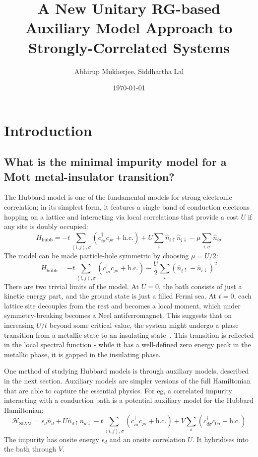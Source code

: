 \documentclass{report}
\title{A New Unitary RG-based Auxiliary Model Approach to Strongly-Correlated Systems}
\author{Abhirup Mukherjee, Siddhartha Lal}
\affil{Indian Institute of Science Education and Research Kolkata, Mohanpur}
\date{\today}
\numberwithin{equation}{section}
\begin{document}
\maketitle
\tableofcontents
\newpage
\chapter{Introduction}

\section{What is the minimal impurity model for a Mott metal-insulator transition?}
\label{sec:min_model}
The Hubbard model is one of the fundamental models for strong electronic correlation; in its simplest form, it features a single band of conduction electrons hopping on a lattice and interacting via local correlations that provide a cost \(U\) if any site is doubly occupied:
\[H_\text{hubb} = -t\sum_{\left<i,j \right>,\sigma}\left(c^\dagger_{i\sigma}c_{j\sigma}+\text{h.c.}\right) + U\sum_i \hat n_{i \uparrow} \hat n_{i \downarrow} - \mu \sum_{i,\sigma}\hat n_{i\sigma}\]
The model can be made particle-hole symmetric by choosing \(\mu = U/2\):
\[H_\text{hubb} = -t\sum_{\left<i,j \right>,\sigma}\left(c^\dagger_{i\sigma}c_{j\sigma}+\text{h.c.}\right) - \frac{U}{2}\sum_i \left(\hat n_{i \uparrow} - \hat n_{i \downarrow}\right)^2\]
There are two trivial limits of the model. At \(U=0\), the bath consists of just a kinetic energy part, and the ground state is just a filled Fermi sea. At \(t=0\), each lattice site decouples from the rest and becomes a local moment, which under symmetry-breaking becomes a Neel antiferromagnet. This suggests that on increasing \(U/t\) beyond some critical value, the system might undergo a phase transition from a metallic state to an insulating state~\cite{Mott_1949}. This transition is reflected in the local spectral function - while it has a well-defined zero energy peak in the metallic phase, it is gapped in the insulating phase.

One method of studying Hubbard models is through auxiliary models, described in the next section. Auxiliary models are simpler versions of the full Hamiltonian that are able to capture the essential physics. For eg, a correlated impurity interacting with a conduction bath is a potential auxiliary model for the Hubbard Hamiltonian:
\begin{equation}
\label{clus_bath_siam}
\mathcal{H}_\text{SIAM} = \epsilon_d \hat n_d + U \hat n_{d \uparrow} \hat n_{d \downarrow} - t\sum_{\left<i,j \right>, \sigma}\left(c^\dagger_{i\sigma}c_{j\sigma} + \text{h.c.}\right) + V\sum_\sigma \left( c^\dagger_{d\sigma}c_{0\sigma} + \text{h.c.}\right) 
\end{equation}
The impurity has onsite energy \(\epsilon_d\) and an onsite correlation \(U\). It hybridises into the bath through \(V\).
\end{document}
